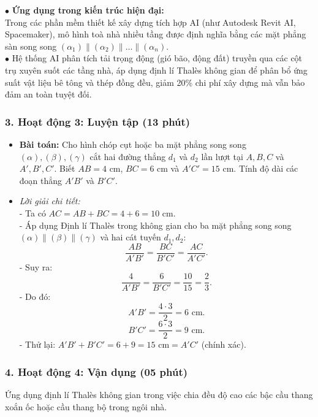 \documentclass[12pt, a4paper]{article}
\begin{document}
\begin{aibox}
    $\bullet$ \textbf{Ứng dụng trong kiến trúc hiện đại:}\\
    Trong các phần mềm thiết kế xây dựng tích hợp AI (như Autodesk Revit AI, Spacemaker), mô hình toà nhà nhiều tầng được định nghĩa bằng các mặt phẳng sàn song song $(\alpha_1) \parallel (\alpha_2) \parallel \dots \parallel (\alpha_n)$.\\
    $\bullet$ Hệ thống AI phân tích tải trọng động (gió bão, động đất) truyền qua các cột trụ xuyên suốt các tầng nhà, áp dụng định lí Thalès không gian để phân bổ ứng suất vật liệu bê tông và thép đồng đều, giảm 20\% chi phí xây dựng mà vẫn bảo đảm an toàn tuyệt đối.
\end{aibox}

\subsubsection*{3. Hoạt động 3: Luyện tập (13 phút)}
\begin{itemize}
    \item \textbf{Bài toán:} Cho hình chóp cụt hoặc ba mặt phẳng song song $(\alpha), (\beta), (\gamma)$ cắt hai đường thẳng $d_1$ và $d_2$ lần lượt tại $A, B, C$ và $A', B', C'$. Biết $AB = 4\text{ cm}$, $BC = 6\text{ cm}$ và $A'C' = 15\text{ cm}$. Tính độ dài các đoạn thẳng $A'B'$ và $B'C'$.
    \item \textit{Lời giải chi tiết:}\\
    - Ta có $AC = AB + BC = 4 + 6 = 10\text{ cm}$.\\
    - Áp dụng Định lí Thalès trong không gian cho ba mặt phẳng song song $(\alpha) \parallel (\beta) \parallel (\gamma)$ và hai cát tuyến $d_1, d_2$:\\
    $$\dfrac{AB}{A'B'} = \dfrac{BC}{B'C'} = \dfrac{AC}{A'C'}.$$
    - Suy ra:
    $$\dfrac{4}{A'B'} = \dfrac{6}{B'C'} = \dfrac{10}{15} = \dfrac{2}{3}.$$
    - Do đó:
    $$A'B' = \dfrac{4 \cdot 3}{2} = 6\text{ cm}.$$
    $$B'C' = \dfrac{6 \cdot 3}{2} = 9\text{ cm}.$$
    - Thử lại: $A'B' + B'C' = 6 + 9 = 15\text{ cm} = A'C'$ (chính xác).
\end{itemize}

\subsubsection*{4. Hoạt động 4: Vận dụng (05 phút)}
Ứng dụng định lí Thalès không gian trong việc chia đều độ cao các bậc cầu thang xoắn ốc hoặc cầu thang bộ trong ngôi nhà.
\end{document}
